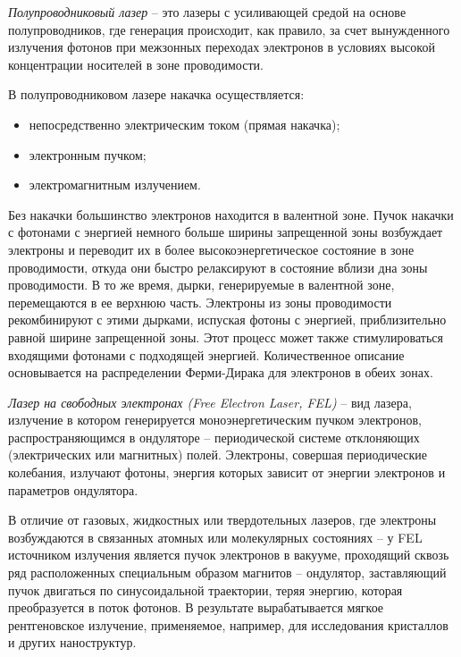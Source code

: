 

\emph{Полупроводниковый лазер} -- это лазеры с усиливающей средой на основе 
полупроводников, где генерация происходит, как правило, за счет вынужденного 
излучения фотонов при межзонных переходах электронов в условиях высокой 
концентрации носителей в зоне проводимости. 

В полупроводниковом лазере накачка осуществляется:
\begin{itemize}
	\item непосредственно электрическим током (прямая накачка);
    \item электронным пучком;
    \item электромагнитным излучением.
\end{itemize}

Без накачки большинство электронов находится в валентной зоне. Пучок накачки с 
фотонами с энергией немного больше ширины запрещенной зоны возбуждает 
электроны и переводит их в более высокоэнергетическое состояние в зоне 
проводимости, откуда они быстро релаксируют в состояние вблизи дна зоны 
проводимости. В то же время, дырки, генерируемые в валентной зоне, 
перемещаются в ее верхнюю часть. Электроны из зоны проводимости 
рекомбинируют с этими дырками, испуская фотоны с энергией, приблизительно 
равной ширине запрещенной зоны. Этот процесс может также стимулироваться 
входящими фотонами с подходящей энергией. Количественное описание основывается 
на распределении Ферми-Дирака для электронов в обеих зонах.


\emph{Лазер на свободных электронах (Free Electron Laser, FEL)} -- вид лазера, 
излучение в котором генерируется моноэнергетическим пучком электронов, 
распространяющимся в ондуляторе -- периодической системе отклоняющих 
(электрических или магнитных) полей. Электроны, совершая периодические 
колебания, излучают фотоны, энергия которых зависит от энергии электронов и 
параметров ондулятора.

В отличие от газовых, жидкостных или твердотельных лазеров, где электроны 
возбуждаются в связанных атомных или молекулярных состояниях -- у FEL 
источником излучения является пучок электронов в вакууме, проходящий сквозь 
ряд расположенных специальным образом магнитов -- ондулятор, заставляющий 
пучок двигаться по синусоидальной траектории, теряя энергию, которая 
преобразуется в поток фотонов. В результате вырабатывается мягкое 
рентгеновское излучение, применяемое, например, для исследования кристаллов и 
других наноструктур.


